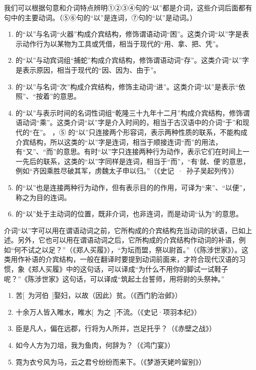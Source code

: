 我们可以根据句意和介词特点辨明①②③④句的“以”都是介词，这些介词后面都有句中的主要动词。（⑤⑥句的“以”是连词，⑦句的“以”是动词。）

\begin{enumerate}[label=\textcircled{\arabic*}]
	\item 的“以”与名词“火器”构成介宾结构，修饰谓语动词“困”。这类介词“以”字是表示动作行为以某物为工具或凭借，相当于现代的“用、拿、把、凭”。
	\item 的“以”与动宾词组“捕蛇”构成介宾结构，修饰谓语动词“存”。这类介词“以”字是表示原因，相当于现代的“因、因为、由于”。
	\item 的“以”与名词“次”构成介宾结构，修饰主动词“进”。这类介词“以”是表示“依照”、“按着”的意思。
	\item 的“以”与表示时间的名词性词组“乾隆三十九年十二月”构成介宾结构，修饰谓语动词“乘”。这类介词“以”字是介入时间的，相当于古汉语中的介词“于”和现代的“在”。
	，⑤ 的“以”只连接两个形容词，表示两种性质的联系，不能构成介宾结构，所以这类的“以”字是连词，相当于顺接连词“而”的用法，有“又”、“而”的意思。有时“以”字只连接两种行为动作，表示它们在时间上一一先后的联系，这类的“以”字同样是连词，相当于“而”，“有‘就、便’的意思，例如“齐因乘胜尽破其军，虏魏太子申以归。”（《史记\ ·\ 孙子吴起列传》）
	\item 的“以”也是连接两种行为动作，但有表示目的的作用，可译为“来”、“以便”，称之为目的连词。
	\item 的“以”处于主动词的位置，既非介词，也非连词，而是动词“认为”的意思。
\end{enumerate}

介词“以”字可以用在谓语动词之前，它所构成的介宾结构充当动词的状语，已如上述。另外，它也可以用在谓语动词之后，它所构成的介宾结构作动词的补语，例如“何不试之以足？”（《郑人买履》），“为坛而盟，祭以尉首。”（《陈涉世家》）。这类用作补语的介宾结构，一般在翻译时要提到动词前面来，才符合现代汉语的习惯，象《郑人买履》中的这句话，可以译成“为什么不用你的脚试一试鞋子呢？”《陈涉世家》这句话，可以译成“筑起土台誓师，用将尉的头祭神。”

\noindent
[\ 为\ ]
\begin{enumerate}[label=\textcircled{\arabic*}]
	\item 苦[\ 为河伯\ ]娶妇，以故（因此）贫。（《西门豹治邺》）
	\item 十余万人皆入睢水，睢水[\ 为之\ ]不流。（《史记·项羽本纪》）
	\item 臣是凡人，偏在远郡，行将为人所并，岂足托乎？（《赤壁之战》）
	\item 如今人方为刀俎，我为鱼肉，何辞为？（《鸿门宴》）
	\item 霓为衣兮风为马，云之君兮纷纷而来下。（《梦游天姥吟留别》）
\end{enumerate}

